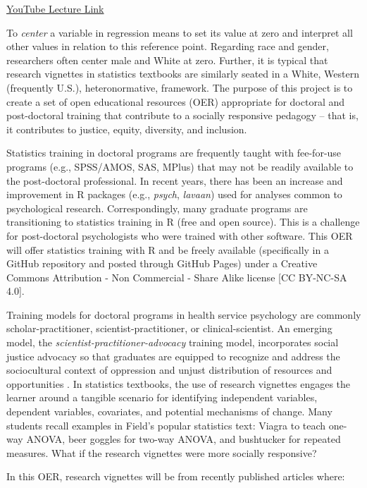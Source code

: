 \documentclass[
  11pt,
]{book}
\begin{document}
\href{https://youtu.be/yy0z85Wla7o}{YouTube Lecture Link}

To \emph{center} a variable in regression means to set its value at zero and interpret all other values in relation to this reference point. Regarding race and gender, researchers often center male and White at zero. Further, it is typical that research vignettes in statistics textbooks are similarly seated in a White, Western (frequently U.S.), heteronormative, framework. The purpose of this project is to create a set of open educational resources (OER) appropriate for doctoral and post-doctoral training that contribute to a socially responsive pedagogy -- that is, it contributes to justice, equity, diversity, and inclusion.

Statistics training in doctoral programs are frequently taught with fee-for-use programs (e.g., SPSS/AMOS, SAS, MPlus) that may not be readily available to the post-doctoral professional. In recent years, there has been an increase and improvement in R packages (e.g., \emph{psych}, \emph{lavaan}) used for analyses common to psychological research. Correspondingly, many graduate programs are transitioning to statistics training in R (free and open source). This is a challenge for post-doctoral psychologists who were trained with other software. This OER will offer statistics training with R and be freely available (specifically in a GitHub repository and posted through GitHub Pages) under a Creative Commons Attribution - Non Commercial - Share Alike license {[}CC BY-NC-SA 4.0{]}.

Training models for doctoral programs in health service psychology are commonly scholar-practitioner, scientist-practitioner, or clinical-scientist. An emerging model, the \emph{scientist-practitioner-advocacy} training model, incorporates social justice advocacy so that graduates are equipped to recognize and address the sociocultural context of oppression and unjust distribution of resources and opportunities \citep{mallinckrodt_scientist-practitioner-advocate_2014}. In statistics textbooks, the use of research vignettes engages the learner around a tangible scenario for identifying independent variables, dependent variables, covariates, and potential mechanisms of change. Many students recall examples in Field's \citeyearpar{field_discovering_2012} popular statistics text: Viagra to teach one-way ANOVA, beer goggles for two-way ANOVA, and bushtucker for repeated measures. What if the research vignettes were more socially responsive?

In this OER, research vignettes will be from recently published articles where:
\end{document}
